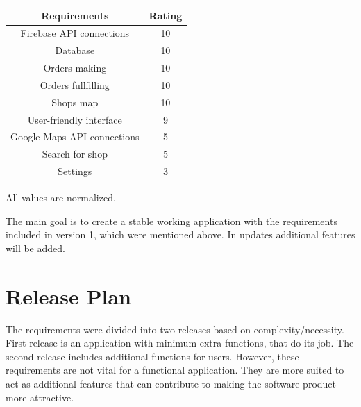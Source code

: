 \documentclass{scrreprt}
\begin{document}
\begin{tabular}{| c | c |} \hline
\textbf {Requirements} & \textbf{Rating} \\ \hline
Firebase API connections & 10\\ \hline
Database & 10\\ \hline
Orders making & 10\\ \hline
Orders fullfilling & 10\\ \hline
Shops map & 10\\ \hline
User-friendly interface & 9\\ \hline
Google Maps API connections & 5\\ \hline
Search for shop & 5\\ \hline
Settings & 3\\ \hline
\end{tabular}

All values are normalized. 

The main goal is to create a stable working application with the requirements included in version 1, which were mentioned above. In updates additional features will be added. 

\section{Release Plan}
The requirements were divided into two releases based on complexity/necessity. First release is an application with minimum extra functions, that do its job. The second release includes additional functions for users. However, these requirements are not vital for a functional application. They are more suited to act as additional features that can contribute to making the software product more attractive.

\begin{figure}[h]
\end{figure}
‎
\end{document}
